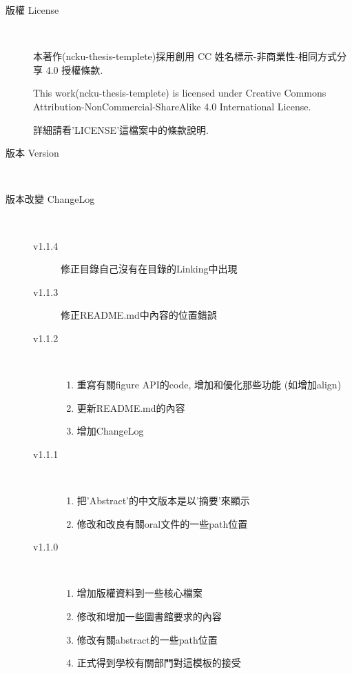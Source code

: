 \begin{description}
  \item[版權 License] \hfill \\

    本著作(ncku-thesis-templete)採用創用 CC 姓名標示-非商業性-相同方式分享 4.0 授權條款.

    This work(ncku-thesis-templete) is licensed under Creative Commons Attribution-NonCommercial-ShareAlike 4.0 International License.

  詳細請看'LICENSE'這檔案中的條款說明.

  \item[版本 Version] \hfill \\
    \ThisThesisVersion

  \item[版本改變 ChangeLog] \hfill \\
    \begin{description}
      \item[v1.1.4] 修正目錄自己沒有在目錄的Linking中出現

      \item[v1.1.3] 修正README.md中內容的位置錯誤

      \item[v1.1.2] \hfill \\
        \begin{enumerate}
          \item 重寫有關figure API的code, 增加和優化那些功能 (如增加align)
          \item 更新README.md的內容
          \item 增加ChangeLog
        \end{enumerate}

      \item[v1.1.1] \hfill \\
        \begin{enumerate}
          \item 把'Abstract'的中文版本是以'摘要'來顯示
          \item 修改和改良有關oral文件的一些path位置
        \end{enumerate}

      \item[v1.1.0] \hfill \\
        \begin{enumerate}
          \item 增加版權資料到一些核心檔案
          \item 修改和增加一些圖書館要求的內容
          \item 修改有關abstract的一些path位置
          \item 正式得到學校有關部門對這模板的接受
        \end{enumerate}


\end{description}
\end{description}
